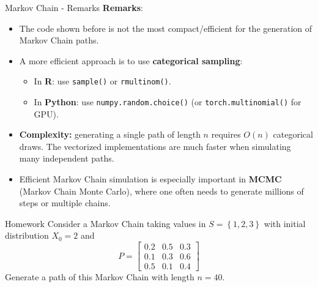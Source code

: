 \documentclass[8pt]{beamer}
\begin{document}
\begin{frame}{Markov Chain - Remarks}
\textbf{Remarks}:
\begin{itemize}
    \item The code shown before is not the most compact/efficient for the generation of Markov Chain paths.
    \item A more efficient approach is to use \textbf{categorical sampling}: 
    \begin{itemize}
        \item In \textbf{R}: use \texttt{sample()} or \texttt{rmultinom()}.
        \item In \textbf{Python}: use \texttt{numpy.random.choice()} (or 			 \texttt{torch.multinomial()} for GPU).
    \end{itemize}
    \item \textbf{Complexity:} generating a single path of length $n$ requires $O(n)$ categorical draws. The vectorized implementations are much faster when simulating many independent paths.
    \item Efficient Markov Chain simulation is especially important in \textbf{MCMC} (Markov Chain Monte Carlo), 
    where one often needs to generate millions of steps or multiple chains.
\end{itemize}
\end{frame}

\begin{frame}{Homework}
Consider a Markov Chain taking values in $S=\left\{ 1,2, 3\right\}$ with initial distribution $X_0=2$ and
\begin{equation*}
P=\left[ \begin{array}{ccc} 0.2 & 0.5 & 0.3\\ 0.1 & 0.3 & 0.6\\
0.5 & 0.1 & 0.4 \end{array}\right]
\end{equation*}
Generate a path of this Markov Chain with length $n=40$.
\end{frame}
\end{document}
